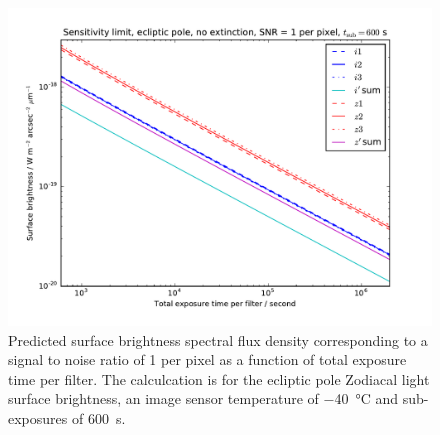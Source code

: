 \documentclass[]{iac}
\begin{document}
\begin{figure}[tp]
  \center \includegraphics[width=\columnwidth]{figures/sens.pdf}
  \caption{\label{fig:sens}Predicted surface brightness spectral flux density corresponding to a signal to noise ratio
    of 1 per pixel as a function of total exposure time per filter. The calculcation is for the ecliptic pole Zodiacal
    light surface brightness, an image sensor temperature of \SI{-40}{\celsius} and sub-exposures of \SI{600}{\second}.}
\end{figure}
\end{document}
